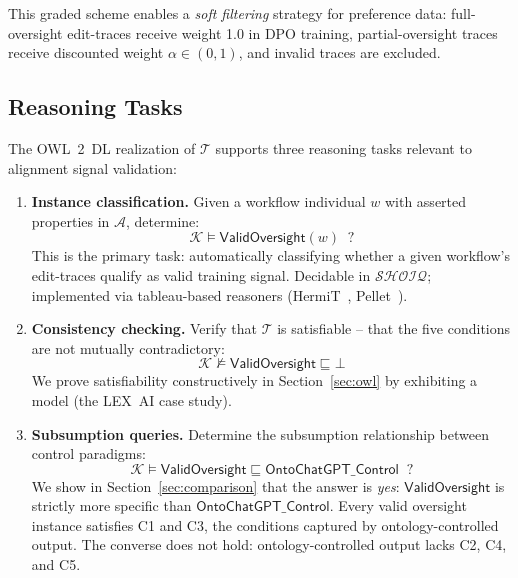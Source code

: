 \documentclass[11pt]{article}
\newcommand{\DL}{\ensuremath{\mathcal{SHOIQ}}\xspace}
\newcommand{\TBox}{\ensuremath{\mathcal{T}}\xspace}
\newcommand{\ABox}{\ensuremath{\mathcal{A}}\xspace}
\newcommand{\KB}{\ensuremath{\mathcal{K}}\xspace}
\newcommand{\sqsub}{\sqsubseteq}
\begin{document}
This graded scheme enables a \emph{soft filtering} strategy for preference data: full-oversight edit-traces receive weight 1.0 in DPO training, partial-oversight traces receive discounted weight $\alpha \in (0, 1)$, and invalid traces are excluded.

\subsection{Reasoning Tasks}
\label{sec:reasoning}

The OWL~2~DL realization of \TBox supports three reasoning tasks relevant to alignment signal validation:

\begin{enumerate}[label=\textbf{R\arabic*.},leftmargin=2.5em]

\item \textbf{Instance classification.}
Given a workflow individual $w$ with asserted properties in \ABox, determine:
\begin{equation}
  \KB \models \mathsf{ValidOversight}(w) \;\; ?
\end{equation}
This is the primary task: automatically classifying whether a given workflow's edit-traces qualify as valid training signal.
Decidable in \DL; implemented via tableau-based reasoners (HermiT~\citep{glimm2014hermit}, Pellet~\citep{sirin2007pellet}).

\item \textbf{Consistency checking.}
Verify that \TBox is satisfiable -- that the five conditions are not mutually contradictory:
\begin{equation}
  \KB \not\models \mathsf{ValidOversight} \sqsub \bot
\end{equation}
We prove satisfiability constructively in Section~\ref{sec:owl} by exhibiting a model (the LEX~AI case study).

\item \textbf{Subsumption queries.}
Determine the subsumption relationship between control paradigms:
\begin{equation}
  \KB \models \mathsf{ValidOversight} \sqsub \mathsf{OntoChatGPT\_Control} \;\; ?
\end{equation}
We show in Section~\ref{sec:comparison} that the answer is \emph{yes}: $\mathsf{ValidOversight}$ is strictly more specific than $\mathsf{OntoChatGPT\_Control}$.
Every valid oversight instance satisfies C1 and C3, the conditions captured by ontology-controlled output.
The converse does not hold: ontology-controlled output lacks C2, C4, and C5.

\end{enumerate}
\end{document}
